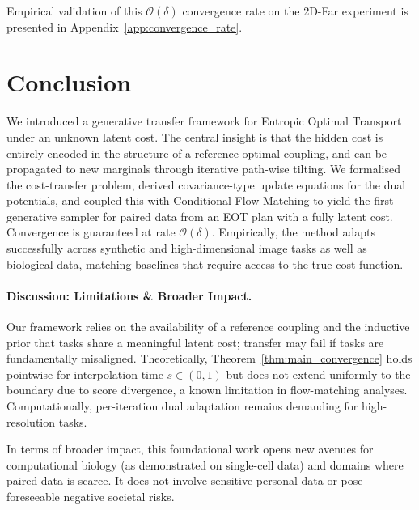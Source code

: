 \documentclass[11pt]{article}
\theoremstyle{definition}
\numberwithin{equation}{section}%
\begin{document}
Empirical validation of this $\mathcal{O}(\delta)$ convergence rate on the 2D-Far experiment is presented in Appendix~\ref{app:convergence_rate}.

\section{Conclusion}
\label{sec:conclusion}

We introduced a generative transfer framework for Entropic Optimal Transport under an unknown latent cost.
The central insight is that the hidden cost is entirely encoded in the structure of a reference optimal coupling, and can be propagated to new marginals through iterative path-wise tilting.
We formalised the cost-transfer problem, derived covariance-type update equations for the dual potentials, and coupled this with Conditional Flow Matching to yield the first generative sampler for paired data from an EOT plan with a fully latent cost.
Convergence is guaranteed at rate $\mathcal{O}(\delta)$.
Empirically, the method adapts successfully across synthetic and high-dimensional image tasks as well as biological data, matching baselines that require access to the true cost function.

\paragraph{Discussion: Limitations \& Broader Impact.}
Our framework relies on the availability of a reference coupling and the inductive prior that tasks share a meaningful latent cost; transfer may fail if tasks are fundamentally misaligned.
Theoretically, Theorem~\ref{thm:main_convergence} holds pointwise for interpolation time $s\in(0,1)$ but does not extend uniformly to the boundary due to score divergence, a known limitation in flow-matching analyses.
Computationally, per-iteration dual adaptation remains demanding for high-resolution tasks.

In terms of broader impact, this foundational work opens new avenues for computational biology (as demonstrated on single-cell data) and domains where paired data is scarce.
It does not involve sensitive personal data or pose foreseeable negative societal risks.


\end{document}
